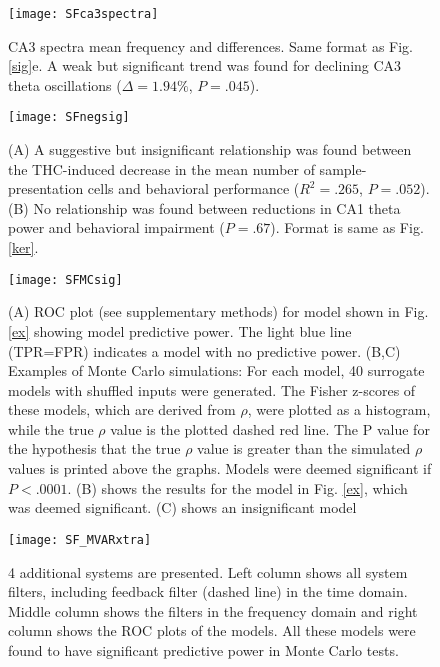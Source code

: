 \documentclass[11pt,a4paper,final]{article}
\begin{document}
\begin{figure}[!ht]
\centering
\texttt{[image: SFca3spectra]}
\caption[CA3 Frequency Spectra]{
CA3 spectra mean frequency and differences. Same format as Fig. \ref{sig}e. A weak but significant trend was found for declining CA3 theta oscillations ($\Delta=1.94\%$, $P=.045$).}
\label{SFca3spectra}
\end{figure}

\begin{figure}[!ht]
\centering
\texttt{[image: SFnegsig]}
\caption[Negative CA1 Theta Power Results]{
(A) A suggestive but insignificant relationship was found between the THC-induced decrease in the mean number of sample-presentation cells and behavioral performance ($R^2=.265$, $P=.052$).
(B) No relationship was found between reductions in CA1 theta power and behavioral impairment ($P=.67$).
Format is same as Fig. \ref{ker}.}
\label{SFnegsig}
\end{figure}

\begin{figure}[!ht]
\centering
\texttt{[image: SFMCsig]}
\caption[MonteCarlo Significance Results]{
(A) ROC plot (see supplementary methods) for model shown in Fig. \ref{ex} showing model predictive power. The light blue line (TPR=FPR) indicates a model with no predictive power.
(B,C) Examples of Monte Carlo simulations: For each model, 40 surrogate models with shuffled inputs were generated. The Fisher z-scores of these models, which are derived from $\rho$,  were plotted as a histogram, while the true $\rho$ value is the plotted dashed red line. The P value for the hypothesis that the true $\rho$ value is greater than the simulated $\rho$ values is printed above the graphs. Models were deemed significant if $P<.0001$. (B) shows the results for the model in Fig. \ref{ex}, which was deemed significant. (C) shows an insignificant model}
\label{SFMCsig}
\end{figure}

\begin{figure}[!ht]
\centering
\texttt{[image: SF\_MVARxtra]}
\caption[Additional System Examples]{
4 additional systems are presented.
Left column shows all system filters, including feedback filter (dashed line) in the time domain.
Middle column shows the filters in the frequency domain and right column shows the ROC plots of the models.
All these models were found to have significant predictive power in Monte Carlo tests.}
\label{SF_MVARxtra}
\end{figure}
\end{document}
